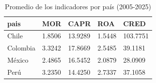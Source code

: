 \begin{table}[htbp]
\centering
\caption{Promedio de los indicadores por país (2005-2025)}
\begin{tabular}{lllll}
\hline
pais & MOR & CAPR & ROA & CRED \\
\hline
Chile & 1.8506 & 13.9289 & 1.5448 & 103.7751 \\
Colombia & 3.3242 & 17.8669 & 2.5485 & 39.1181 \\
México & 2.4865 & 16.5452 & 2.0879 & 28.0909 \\
Perú & 3.2350 & 14.4250 & 2.7337 & 37.1058 \\
\hline
\end{tabular}
\label{tab:tabla2_medias_por_pais}
\end{table}